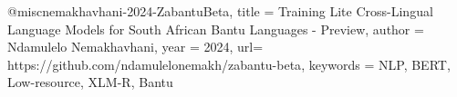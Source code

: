@misc{nemakhavhani-2024-ZabantuBeta,
  title   = {Training Lite Cross-Lingual Language Models for South African Bantu Languages - Preview},
  author  = {Ndamulelo Nemakhavhani},
  year    = {2024},
  url= {https://github.com/ndamulelonemakh/zabantu-beta},
  keywords = {NLP, BERT, Low-resource, XLM-R, Bantu}
}